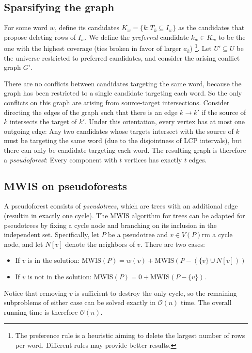 \documentclass[11pt,a4paper]{article}
\begin{document}
\subsection{Sparsifying the graph}

For some word $w$, define its candidates $K_w = \{ k: T_k \subseteq I_w\}$ as the candidates that propose deleting rows of $I_w$. We define the \emph{preferred} candidate $k_w \in K_w$ to be the one with the highest coverage (ties broken in favor of larger $a_k$)
\footnote{
    The preference rule is a heuristic aiming to delete the largest number of rows per word. Different rules may provide better results.
}. 
Let $U' \subseteq U$ be the universe restricted to preferred candidates, and consider the arising conflict graph $G'$.

There are no conflicts between candidates targeting the same word, because the graph has been restricted to a single candidate targeting each word. So the only conflicts on this graph are arising from source-target intersections. Consider directing the edges of the graph such that there is an edge $k \rightarrow k'$ if the source of $k$ intersects the target of $k'$. Under this orientation, every vertex has at most one outgoing edge: Any two candidates whose targets intersect with the source of $k$ must be targeting the same word (due to the disjointness of LCP intervals), but there can only be candidate targeting each word. The resulting graph is therefore a \emph{pseudoforest}: Every component with $t$ vertices has exactly $t$ edges.

\subsection{MWIS on pseudoforests}

A pseudoforest consists of \emph{pseudotrees}, which are trees with an additional edge (resultin in exactly one cycle). The MWIS algorithm for trees can be adapted for pseudotrees by fixing a cycle node and branching on its inclusion in the independent set. Specifically, let $P$ be a pseudotree and $v \in V(P)$rm  a cycle node, and let $N[v]$ denote the neighbors of $v$. There are two cases: \begin{itemize}
    \item If $v$ is in the solution: $\mathrm{MWIS}(P) = w(v) + \mathrm{MWIS}(P - \left(\{v\} \cup N[v] \right))$
    \item If $v$ is not in the solution: $\mathrm{MWIS}(P) = 0 + \mathrm{MWIS}(P - \{v\})$.
\end{itemize}
Notice that removing $v$ is sufficient to destroy the only cycle, so the remaining subproblems of either case can be solved exactly in $\mathcal{O}(n)$ time. The overall running time is therefore $\mathcal{O}(n)$.
\end{document}
